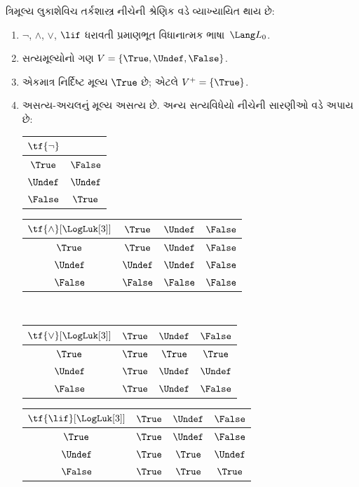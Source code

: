 \documentclass[../../../include/open-logic-section]{subfiles}
\begin{document}
\begin{defn}
ત્રિમૂલ્ય લુકાશેવિચ તર્કશાસ્ત્ર નીચેની શ્રેણિક વડે વ્યાખ્યાયિત થાય છે:
\begin{enumerate}
  \item $\lnot$, $\land$, $\lor$, $\lif$ ધરાવતી પ્રમાણભૂત
  વિધાનાત્મક ભાષા~$\Lang L_0$.
  \item સત્યમૂલ્યોનો ગણ $V = \{\True, \Undef, \False\}$.
  \item એકમાત્ર નિર્દિષ્ટ મૂલ્ય $\True$ છે; એટલે $V^+ = \{\True\}$.
  \item અસત્ય-અચલનું મૂલ્ય અસત્ય છે. અન્ય સત્યવિધેયો નીચેની
  સારણીઓ વડે અપાય છે:
  \begin{center}
    \begin{tabular}{c|c}
      $\tf{\lnot}$ & \\
      \hline
      $\True$ & $\False$ \\
      $\Undef$ & $\Undef$ \\
      $\False$ & $\True$
    \end{tabular}
    \quad
    \begin{tabular}{c|ccc}
      $\tf{\land}[\LogLuk[3]]$ & $\True$ & $\Undef$ & $\False$ \\
      \hline
      $\True$ & $\True$ & $\Undef$ & $\False$ \\
      $\Undef$ & $\Undef$ & $\Undef$ & $\False$\\
      $\False$ & $\False$ & $\False$ & $\False$
    \end{tabular}
    \\[2ex]
    \begin{tabular}{c|ccc}
      $\tf{\lor}[\LogLuk[3]]$ & $\True$ & $\Undef$ & $\False$ \\
      \hline
      $\True$ & $\True$ & $\True$ & $\True$ \\
      $\Undef$ & $\True$ & $\Undef$ & $\Undef$ \\
      $\False$ & $\True$ & $\Undef$ & $\False$
    \end{tabular}
    \quad
    \begin{tabular}{c|ccc}
      $\tf{\lif}[\LogLuk[3]]$ & $\True$ & $\Undef$ & $\False$ \\
      \hline
      $\True$ & $\True$ & $\Undef$ & $\False$ \\
      $\Undef$ & $\True$ & $\True$ & $\Undef$ \\
      $\False$ & $\True$ & $\True$ & $\True$
    \end{tabular}
  \end{center}
\end{enumerate}
\end{defn}
\end{document}
